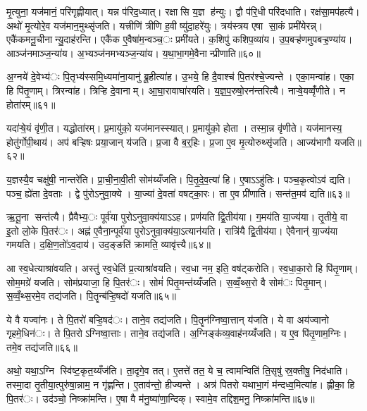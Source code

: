 मृ॒त्युना॒ यज॑मानं॒ परि॑गृह्णीयात्। यन्न प॑रिद॒ध्यात्। रक्षासि य॒ज्ञ ह॑न्युः। द्वौ प॑रि॒धी परि॑दधाति। रक्ष॑सा॒मप॑हत्यै। अथो॑ मृ॒त्योरे॒व यज॑मान॒मुथ्सृ॑जति। यत्त्रीणि॑ त्रीणि ह॒वीष्यु॑दा॒हरे॑युः। त्रय॑स्त्रय एषा सा॒कं प्रमी॑येरन्न्। एकै॑कमनू॒चीनान्यु॒दाह॑रन्ति। एकै॑क ए॒वैषा॑म॒न्वञ्च॒ः प्रमी॑यते। क॒शिपु॑ कशिप॒व्या॑य। उ॒प॒बऱ्ह॑णमुपबऱ्ह॒ण्या॑य। आञ्ज॑नमाञ्ज॒न्या॑य। अ॒भ्यञ्ज॑नमभ्यञ्ज॒न्या॑य। य॒था॒भा॒गमे॒वैनान्प्रीणाति॥६०॥


अ॒ग्नये॑ दे॒वेभ्य॑ः पि॒तृभ्य॑स्समि॒ध्यमा॑ना॒यानु॑ ब्रू॒हीत्या॑ह। उ॒भये॒ हि दै॒वाश्च॑ पि॒तर॑श्चे॒ज्यन्ते। एका॒मन्वा॑ह। एका॒ हि पि॑तृ॒णाम्। त्रिरन्वा॑ह। त्रिऱ्हि दे॒वानाम्। आ॒घा॒रावाघा॑रयति। य॒ज्ञ॒प॒रुषो॒रन॑न्तरित्यै। नाऱ्षे॒यव्वृँ॑णीते। न होता॑रम्॥६१॥

यदा॑ऱ्षे॒यं वृ॑णी॒त। यद्धोता॑रम्। प्र॒मायु॑को॒ यज॑मानस्स्यात्। प्र॒मायु॑को॒ होता। तस्मा॒न्न वृ॑णीते। यज॑मानस्य॒ होतु॑र्गोपी॒थाय॑। अप॑ बऱ्हिषः प्रया॒जान् य॑जति। प्र॒जा वै ब॒र्॒हिः। प्र॒जा ए॒व मृ॒त्योरुथ्सृ॑जति। आज्य॑भागौ यजति॥६२॥

य॒ज्ञस्यै॒व चक्षु॑षी॒ नान्तरे॑ति। प्रा॒ची॒ना॒वी॒ती सोम॑य्यँजति। पि॒तृ॒दे॒व॒त्या॑ हि। ए॒षाऽऽहु॑तिः। पञ्च॒कृत्वोऽव॑ द्यति। पञ्च॒ ह्ये॑ता दे॒वताः। द्वे पु॑रोऽनुवा॒क्ये। या॒ज्या॑ दे॒वता॑ वषट्का॒रः। ता ए॒व प्री॑णाति। सन्त॑त॒मव॑ द्यति॥६३॥

ऋ॒तू॒ना सन्त॑त्यै। प्रैवैभ्य॒ः पूर्व॑या पुरोऽनुवा॒क्य॑याऽऽह। प्रण॑यति द्वि॒तीय॑या। ग॒मय॑ति या॒ज्य॑या। तृ॒तीये॒ वा इ॒तो लो॒के पि॒तर॑ः। अह्न॑ ए॒वैना॒न्पूर्व॑या पुरोऽनुवा॒क्य॑या॒ऽत्यान॑यति। रात्रि॑यै द्वि॒तीय॑या। ऐवैनान्॑ या॒ज्य॑या गमयति। द॒क्षि॒ण॒तो॑ऽव॒दाय॑। उद॒ङ्ङति॑ क्रामति॒ व्यावृ॑त्त्यै॥६४॥

आ स्व॒धेत्याश्रा॑वयति। अस्तु॑ स्व॒धेति॑ प्र॒त्याश्रा॑वयति। स्व॒धा नम॒ इति॒ वष॑ट्करोति। स्व॒धा॒का॒रो हि पि॑तृ॒णाम्। सोम॒मग्रे॑ यजति। सोम॑प्रयाजा॒ हि पि॒तर॑ः। सोमं॑ पितृ॒मन्त॑य्यँजति। स॒व्वँ॒थ्स॒रो वै सोम॑ः पितृ॒मान्। स॒व्वँ॒थ्स॒रमे॒व तद्य॑जति। पि॒तॄन्ब॑ऱ्हि॒षदो॑ यजति॥६५॥

ये वै यज्वा॑नः। ते पि॒तरो॑ बऱ्हि॒षद॑ः। ताने॒व तद्य॑जति। पि॒तॄन॑ग्निष्वा॒त्तान् य॑जति। ये वा अय॑ज्वानो गृहमे॒धिन॑ः। ते पि॒तरोऽग्निष्वा॒त्ताः। ताने॒व तद्य॑जति। अ॒ग्निङ्क॑व्य॒वाह॑नय्यँजति। य ए॒व पि॑तृ॒णाम॒ग्निः। तमे॒व तद्य॑जति॥६६॥

अथो॒ यथा॒ऽग्नि स्वि॑ष्ट॒कृत॒य्यँज॑ति। ता॒दृगे॒व तत्। ए॒तत्ते॑ तत॒ ये च॒ त्वामन्विति॑ ति॒सृषु॑ स्र॒क्तीषु॒ निद॑धाति। तस्मा॒दा तृ॒तीया॒त्पुरु॑षा॒न्नाम॒ न गृ॑ह्णन्ति। ए॒ताव॑न्तो॒ हीज्यन्ते। अत्र॑ पितरो यथाभा॒गं म॑न्दध्व॒मित्या॑ह। ह्लीका॒ हि पि॒तर॑ः। उद॑ञ्चो॒ निष्क्रा॑मन्ति। ए॒षा वै म॑नु॒ष्या॑णा॒न्दिक्। स्वामे॒व तद्दिश॒मनु॒ निष्क्रा॑मन्ति॥६७॥

